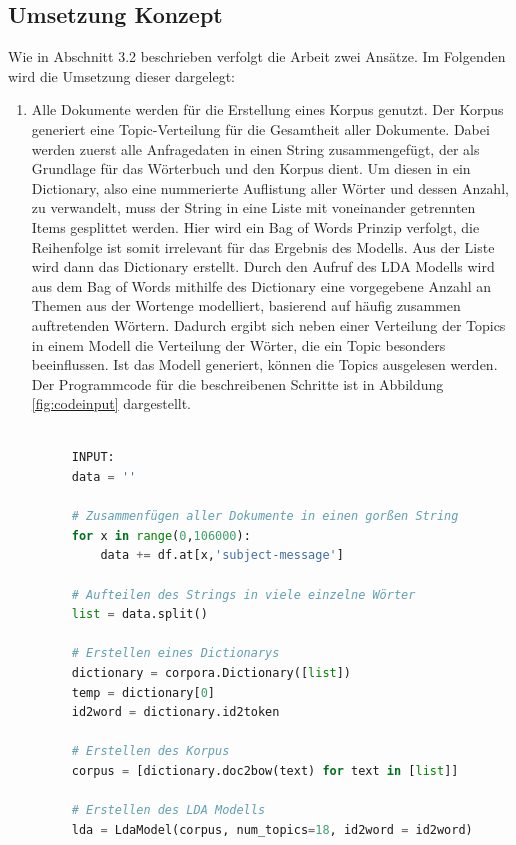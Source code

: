 \documentclass[german,version-2020-11]{uzl-thesis}
\begin{document}
\begin{itemize}
\section{Umsetzung Konzept}

Wie in Abschnitt 3.2 beschrieben verfolgt die Arbeit zwei Ansätze. Im Folgenden wird die Umsetzung dieser dargelegt: \\
 
\begin{enumerate}
\item
Alle Dokumente werden für die Erstellung eines Korpus genutzt. Der Korpus generiert eine Topic-Verteilung für die Gesamtheit aller Dokumente. Dabei werden zuerst alle Anfragedaten in einen String zusammengefügt, der als Grundlage für das Wörterbuch und den Korpus dient. Um diesen in ein Dictionary, also eine nummerierte Auflistung aller Wörter und dessen Anzahl, zu verwandelt, muss der String in eine Liste mit voneinander getrennten Items gesplittet werden. Hier wird ein Bag of Words Prinzip verfolgt, die Reihenfolge ist somit irrelevant für das Ergebnis des Modells. Aus der Liste wird dann das Dictionary erstellt. Durch den Aufruf des LDA Modells wird aus dem Bag of Words mithilfe des Dictionary eine vorgegebene Anzahl an Themen aus der Wortenge modelliert, basierend auf häufig zusammen auftretenden Wörtern. Dadurch ergibt sich neben einer Verteilung der Topics in einem Modell die Verteilung der Wörter, die ein Topic besonders beeinflussen. Ist das Modell generiert, können die Topics ausgelesen werden. Der Programmcode für die beschreibenen Schritte ist in Abbildung \ref{fig:codeinput} dargestellt.\\
\\

\begin{figure}[H]
\begin{lstlisting}[language=Python, basicstyle=\small]
INPUT:
data = ''

# Zusammenfügen aller Dokumente in einen gorßen String
for x in range(0,106000):
    data += df.at[x,'subject-message']

# Aufteilen des Strings in viele einzelne Wörter
list = data.split()

# Erstellen eines Dictionarys
dictionary = corpora.Dictionary([list])
temp = dictionary[0]
id2word = dictionary.id2token

# Erstellen des Korpus
corpus = [dictionary.doc2bow(text) for text in [list]]

# Erstellen des LDA Modells
lda = LdaModel(corpus, num_topics=18, id2word = id2word)


\end{lstlisting}
\end{figure}
\end{enumerate}
\end{itemize}
\end{document}
